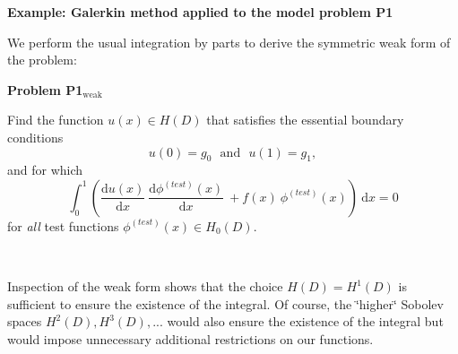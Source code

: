 \begin{center} {\bfseries  Example\-: Galerkin method applied to the model problem P1 }\end{center}  We perform the usual integration by parts to derive the symmetric weak form of the problem\-: \par
 \par
 \begin{center} \begin{TabularC}{1}
\hline
\begin{center} \begin{center}{\bfseries  Problem P1$_{\mbox{weak}}$  }\end{center}  Find the function $ u(x) \in H(D) $ that satisfies the essential boundary conditions \[ u(0) = g_0 \ \ \ \mbox{and} \ \ \ u(1) = g_1, \] and for which \[ \int_0^1 \left( \frac{\mbox{d} u(x)}{\mbox{d} x} \ \frac{\mbox{d} \phi^{(test)}(x)}{\mbox{d} x} \ + f(x) \ \phi^{(test)}(x) \right)\ \mbox{d}x = 0 \] for {\itshape all} test functions $ \phi^{(test)}(x) \in H_0(D). $ \end{center}    \\
\end{TabularC}
\end{center}  \par
\par
 Inspection of the weak form shows that the choice $H(D) = H^1(D) $ is sufficient to ensure the existence of the integral. Of course, the \char`\"{}higher\char`\"{} Sobolev spaces $ H^2(D), H^3(D), ... $ would also ensure the existence of the integral but would impose unnecessary additional restrictions on our functions.

